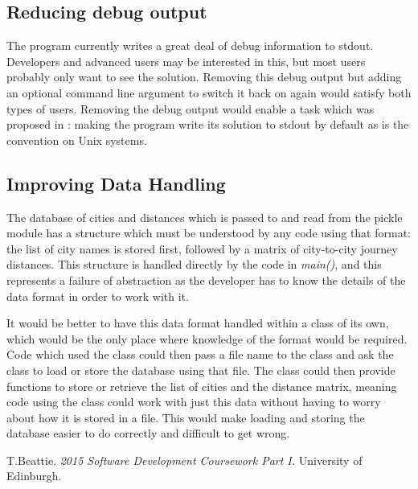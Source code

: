 \documentclass[11pt, oneside]{article}   %
\begin{document}
\subsection{Reducing debug output}
The program currently writes a great deal of debug information to stdout.
Developers and advanced users may be interested in this, but most users probably only want to see the solution.
Removing this debug output but adding an optional command line argument to switch it back on again would satisfy both types of users.
Removing the debug output would enable a task which was proposed in \cite{ref:Part-I}: making the program write its solution to stdout by default as is the convention on Unix systems.

\subsection{Improving Data Handling}
The database of cities and distances which is passed to and read from the pickle module has a structure which must be understood by any code using that format: the list of city names is stored first, followed by a matrix of city-to-city journey distances.
This structure is handled directly by the code in {\em main()}, and this represents a failure of abstraction as the developer has to know the details of the data format in order to work with it.  

It would be better to have this data format handled within a class of its own, which would be the only place where knowledge of the format would be required.
Code which used the class could then pass a file name to the class and ask the class to load or store the database using that file.
The class could then provide functions to store or retrieve the list of cities and the distance matrix, meaning code using the class could work with just this data without having to worry about how it is stored in a file.
This would make loading and storing the database easier to do correctly and difficult to get wrong.

\begin{thebibliography}{100}

 T.Beattie. {\em 2015 Software Development Coursework Part I.} University of Edinburgh.

\end{thebibliography}
\end{document}
